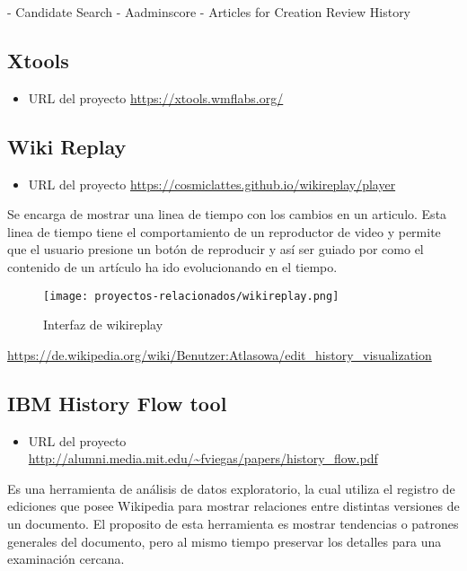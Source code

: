 - Candidate Search
- Aadminscore
- Articles for Creation Review History

\subsection{Xtools}
\begin{itemize}
    \item URL del proyecto \url{https://xtools.wmflabs.org/}
\end{itemize}

\subsection{Wiki Replay}
\begin{itemize}
    \item URL del proyecto \url{https://cosmiclattes.github.io/wikireplay/player}
\end{itemize}

Se encarga de mostrar una linea de tiempo con los cambios en un articulo. Esta linea de tiempo
tiene el comportamiento de un reproductor de video y permite que el usuario presione un botón de
reproducir y así ser guiado por como el contenido de un artículo ha ido evolucionando en el tiempo.

\begin{figure}[H]
    \centering
    \texttt{[image: proyectos-relacionados/wikireplay.png]}
    \caption{Interfaz de wikireplay}
    \label{wikireplay}
\end{figure}


\url{https://de.wikipedia.org/wiki/Benutzer:Atlasowa/edit_history_visualization}

\subsection{IBM History Flow tool}

\begin{itemize}
    \item URL del proyecto \url{http://alumni.media.mit.edu/~fviegas/papers/history_flow.pdf}
\end{itemize}

Es una herramienta de análisis de datos exploratorio, la cual utiliza el registro de ediciones que posee Wikipedia para mostrar relaciones entre distintas versiones de un documento. El proposito de esta herramienta es mostrar tendencias o patrones generales del documento, pero al mismo tiempo preservar los detalles para una examinación cercana.

